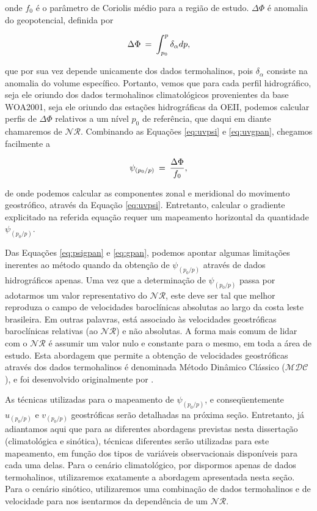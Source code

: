 onde $f_0$ é o parâmetro de Coriolis médio para a região de estudo. $\Delta \Phi$ é anomalia do geopotencial, definida por 

\begin{equation}
\Delta \Phi \: = \: \int_{p_0}^{p} \delta_\alpha dp,
\vspace{0.5cm}
\label{eq:gpan}
\end{equation}

que por sua vez depende unicamente dos dados termohalinos, pois 
$\delta_\alpha$ consiste na anomalia do volume específico.  Portanto, vemos que para cada perfil hidrográfico,
seja ele oriundo dos dados termohalinos climatológicos provenientes da base WOA2001, seja ele oriundo das
estações hidrográficas da OEII, podemos calcular perfis de $\Delta \Phi$ relativos a um nível 
$p_0$ de referência, que daqui em diante chamaremos de $\mathcal{NR}$. 
Combinando as Equações \ref{eq:uvpsi} e \ref{eq:uvgpan}, chegamos facilmente a 

\begin{equation}
\psi_{(p_0/p)} \: = \: \frac{\Delta \Phi}{f_0},
\vspace{0.5cm}
\label{eq:psigpan}
\end{equation}

de onde podemos calcular as componentes zonal e meridional do movimento geostrófico, através da Equação 
\ref{eq:uvpsi}. Entretanto, calcular o gradiente explicitado na referida equação requer um mapeamento
horizontal da quantidade $\psi_{(p_0/p)}$. 

Das Equações \ref{eq:psigpan} e \ref{eq:gpan}, podemos apontar algumas limitações inerentes ao método quando da obtenção 
de $\psi_{(p_0/p)}$ através de dados hidrográficos apenas.
Uma vez que a determinação de $\psi_{(p_0/p)}$ passa por adotarmos um valor representativo do $\mathcal{NR}$, 
este deve ser tal que melhor reproduza o campo de velocidades baroclínicas absolutas 
ao largo da costa leste brasileira. Em outras palavras, está associado às velocidades geostróficas 
baroclínicas relativas (ao $\mathcal{NR}$) e não absolutas. A forma mais comum de lidar com o $\mathcal{NR}$
é assumir um valor nulo e constante para o mesmo, em toda a área de estudo. Esta abordagem que permite a obtenção
de velocidades geostróficas através dos dados termohalinos é denominada Método Dinâmico Clássico ($\mathcal{MDC}$),
e foi desenvolvido originalmente por \cite{sandstrom_helland1903}.

As técnicas utilizadas para o mapeamento de $\psi_{(p_0/p)}$, e conseq\"uentemente $u_{(p_0/p)}$ e $v_{(p_0/p)}$ 
geostróficas serão detalhadas na próxima seção.
Entretanto, já adiantamos aqui que para as diferentes abordagens previstas nesta dissertação
(climatológica e sinótica), técnicas diferentes serão utilizadas para este mapeamento, em 
função dos tipos de variáveis observacionais disponíveis para cada uma delas. Para o cenário 
climatológico, por dispormos apenas de dados termohalinos, utilizaremos exatamente a abordagem 
apresentada nesta seção. Para o cenário sinótico, utilizaremos uma com\-bi\-na\-ção de dados termohalinos
e de velocidade para nos isentarmos da dependência de um $\mathcal{NR}$. 

